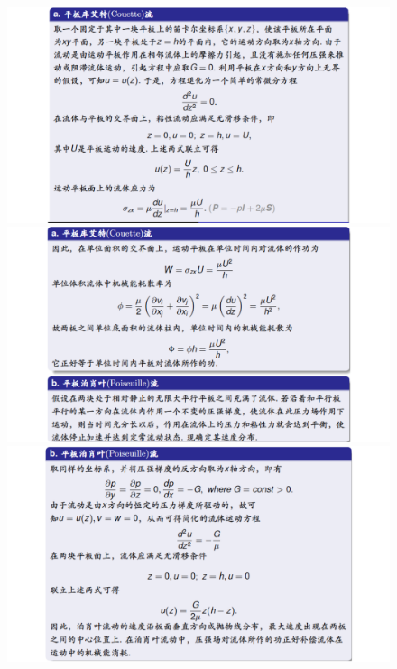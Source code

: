 \documentclass[UTF8,12pt]{article}
\begin{document}
\begin{figure}[h]
    \centering
    \includegraphics[width=.8\linewidth]{img/cal-2018_06_Page4.png}
    \includegraphics[width=.8\linewidth]{img/cal-2018_06_Page5.png}
    \includegraphics[width=.8\linewidth]{img/cal-2018_06_Page6.png}
\end{figure}
\end{document}
